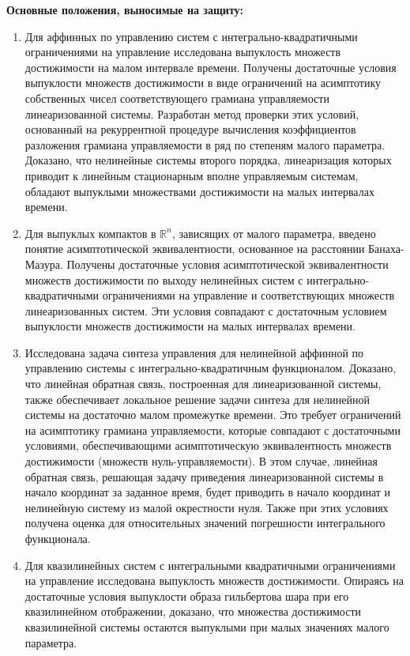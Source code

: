 \documentclass[../main.tex]{subfiles}
\begin{document}
\textbf{Основные положения, выносимые на защиту:} 
\begin{enumerate}
	\item Для аффинных по управлению систем с интегрально-квадратичными ограничениями на управление исследована выпуклость множеств достижимости на малом интервале времени.
	Получены достаточные условия выпуклости множеств достижимости в виде ограничений на асимптотику собственных чисел соответствующего грамиана управляемости линеаризованной системы.
	Разработан метод проверки этих условий, основанный на рекуррентной процедуре вычисления коэффициентов разложения грамиана управляемости в ряд по степеням малого параметра.
	Доказано, что нелинейные системы второго порядка, линеаризация которых приводит к линейным стационарным вполне управляемым системам, обладают выпуклыми множествами достижимости на малых интервалах времени.
	
	\item Для выпуклых компактов в $\mathbb{R}^n$, зависящих от малого параметра, введено понятие асимптотической эквивалентности, основанное на расстоянии Банаха-Мазура.
	Получены достаточные условия асимптотической эквивалентности множеств достижимости по выходу нелинейных систем с интегрально-квадратичными ограничениями на управление и соответствующих множеств линеаризованных систем. 
	Эти условия совпадают с достаточным условием выпуклости множеств достижимости на малых интервалах времени.
	
	\item Исследована задача синтеза управления для нелинейной аффинной по управлению системы с интегрально-квадратичным функционалом. 
	Доказано, что линейная обратная связь, построенная для линеаризованной системы, также обеспечивает локальное решение задачи синтеза для нелинейной системы на достаточно малом промежутке времени. 
	Это требует ограничений на асимптотику грамиана управляемости, которые совпадают с достаточными условиями, обеспечивающими асимптотическую эквивалентность множеств достижимости (множеств нуль-управляемости). 
	В этом случае, линейная обратная связь, решающая задачу приведения линеаризованной системы в начало координат за заданное время, будет приводить в начало координат и нелинейную систему из малой окрестности нуля.
	Также при этих условиях получена оценка для относительных значений погрешности интегрального функционала. 
	
	\item Для квазилинейных систем с интегральными квадратичными ограничениями на управление исследована выпуклость множеств достижимости. 
	Опираясь на достаточные условия выпуклости образа гильбертова шара при его квазилинейном отображении, доказано, что множества достижимости квазилинейной системы остаются выпуклыми при малых значениях малого параметра. 
\end{enumerate}
\end{document}
